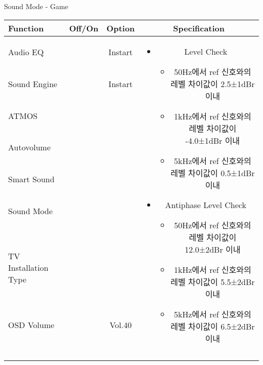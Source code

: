 \begin{frame}[t]{Sound Mode - Game}
\begin{tiny}
\begin{tabular}{@{}lccc@{}}
\toprule
Function & Off/On & Option & Specification \\
\midrule
Audio EQ & \color{black}{Off} & Instart &
\multirow{10}{60mm}{
\begin{itemize}
    \item Level Check
    \begin{itemize}
        \item 50Hz에서 ref 신호와의 레벨 차이값이 2.5±1dBr 이내
        \item 1kHz에서 ref 신호와의 레벨 차이값이 -4.0±1dBr 이내
        \item 5kHz에서 ref 신호와의 레벨 차이값이 0.5±1dBr 이내
    \end{itemize}
    \item Antiphase Level Check
    \begin{itemize}
        \item 50Hz에서 ref 신호와의 레벨 차이값이 12.0±2dBr 이내
        \item 1kHz에서 ref 신호와의 레벨 차이값이 5.5±2dBr 이내
        \item 5kHz에서 ref 신호와의 레벨 차이값이 6.5±2dBr 이내
    \end{itemize}
\end{itemize}
} \\
Sound Engine & \color{blue}{On} & Instart & \\
ATMOS & \color{black}{Off}  & & \\
Autovolume & \color{black}{Off} & & \\
Smart Sound & \color{black}{Off} & & \\
Sound Mode & \color{blue}{On} & \color{blue}{Game} & \\
TV Installation Type & \color{blue}{On} & \color{black}{Standtype1} & \\
OSD Volume & \color{blue}{On} & Vol.40 & \\
& & & \\
& & & \\
& & & \\
& & & \\
\midrule
\end{tabular}
\end{tiny}

\end{frame}



